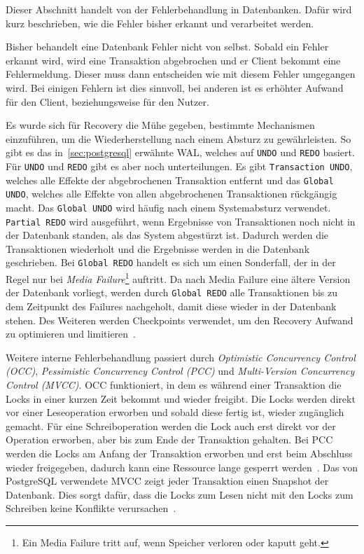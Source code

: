 
Dieser Abschnitt handelt von der Fehlerbehandlung in Datenbanken.
Dafür wird kurz beschrieben, wie die Fehler bisher erkannt und verarbeitet werden.

Bisher behandelt eine Datenbank Fehler nicht von selbst.
Sobald ein Fehler erkannt wird, wird eine Transaktion abgebrochen und er Client bekommt eine Fehlermeldung.
Dieser muss dann entscheiden wie mit diesem Fehler umgegangen wird.
Bei einigen Fehlern ist dies sinnvoll, bei anderen ist es erhöhter Aufwand für den Client, beziehungsweise für
den Nutzer.

Es wurde sich für Recovery die Mühe gegeben, bestimmte Mechanismen einzuführen, um die Wiederherstellung nach
einem Absturz zu gewährleisten.
So gibt es das in~\ref{sec:postgresql} erwähnte WAL, welches auf \texttt{UNDO} und \texttt{REDO} basiert.
Für \texttt{UNDO} und \texttt{REDO} gibt es aber noch unterteilungen.
Es gibt \texttt{Transaction UNDO}, welches alle Effekte der abgebrochenen Transaktion entfernt und
das \texttt{Global UNDO}, welches alle Effekte von allen abgebrochenen Transaktionen rückgängig macht.
Das \texttt{Global UNDO} wird häufig nach einem Systemabsturz verwendet.
\texttt{Partial REDO} wird ausgeführt, wenn Ergebnisse von Transaktionen noch nicht in der Datenbank standen,
als das System abgestürzt ist.
Dadurch werden die Transaktionen wiederholt und die Ergebnisse werden in die Datenbank geschrieben.
Bei \texttt{Global REDO} handelt es sich um einen Sonderfall, der in der Regel nur bei \emph{Media Failure}\footnote{Ein
	Media Failure tritt auf, wenn Speicher verloren oder kaputt geht.} auftritt.
Da nach Media Failure eine ältere Version der Datenbank vorliegt, werden durch \texttt{Global REDO} alle Transaktionen
bis zu dem Zeitpunkt des Failures nachgeholt, damit diese wieder in der Datenbank stehen.
Des Weiteren werden Checkpoints verwendet, um den Recovery Aufwand zu optimieren und limitieren~\cite{Haerder1983}.

Weitere interne Fehlerbehandlung passiert durch \emph{Optimistic Concurrency Control (OCC)},
\emph{Pessimistic Concurrency Control (PCC)} und \emph{Multi-Version Concurrency Control (MVCC)}\@.
OCC funktioniert, in dem es während einer Transaktion die Locks in einer kurzen Zeit bekommt und wieder freigibt.
Die Locks werden direkt vor einer Leseoperation erworben und sobald diese fertig ist, wieder zugänglich gemacht.
Für eine Schreiboperation werden die Lock auch erst direkt vor der Operation erworben, aber bis zum Ende der
Transaktion gehalten.
Bei PCC werden die Locks am Anfang der Transaktion erworben und erst beim Abschluss wieder freigegeben, dadurch kann
eine Ressource lange gesperrt werden~\cite{IBMConcurrencyControl}.
Das von PostgreSQL verwendete MVCC zeigt jeder Transaktion einen Snapshot der Datenbank.
Dies sorgt dafür, dass die Locks zum Lesen nicht mit den Locks zum Schreiben keine Konflikte verursachen~\cite{PostgreSQLMVCC}.
